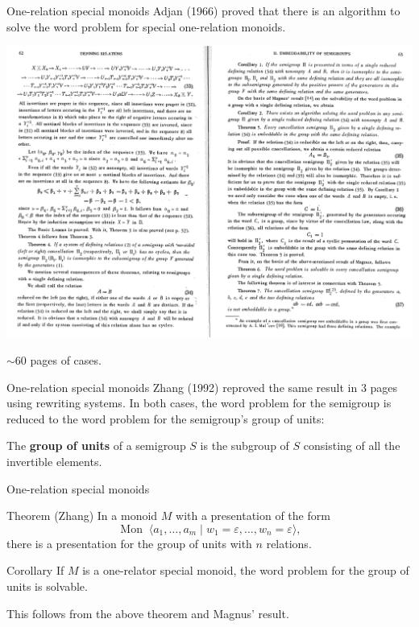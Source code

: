 \documentclass[]{beamer}
\let\epsilon\varepsilon
\newcommand{\Mon}{\operatorname{Mon}\;}
\newcommand{\pskip}{\medskip}
\begin{document}
\begin{frame}{One-relation special monoids}
	Adjan (1966) proved that there is an algorithm to solve the word problem for special one-relation monoids.

	\begin{center}
		\vspace{-0.2cm}
		\includegraphics[height=0.65\textheight]{adjan.png}
	\end{center}

	\pause
	\vspace{-0.5cm}
	$\sim$60 pages of cases.
\end{frame}

\begin{frame}{One-relation special monoids}
	Zhang (1992) reproved the same result in 3 pages using rewriting systems. In both cases, the word problem for the semigroup is reduced to the word problem for the semigroup's group of units:\pskip

	\pause
	The \textbf{group of units} of a semigroup $S$ is the subgroup of $S$ consisting of all the invertible elements.
\end{frame}

\begin{frame}{One-relation special monoids}
	\begin{block}{Theorem (Zhang)}
		In a monoid $M$ with a presentation of the form
			\[ \Mon \langle a_1, \ldots, a_m \mid w_1 = \epsilon, \ldots, w_n = \epsilon \rangle, \]
		there is a presentation for the group of units with $n$ relations.
	\end{block}

	\pause
	\begin{block}{Corollary}
		If $M$ is a one-relator special monoid, the word problem for the group of units is solvable.
	\end{block}

	This follows from the above theorem and Magnus' result.
\end{frame}
\end{document}
